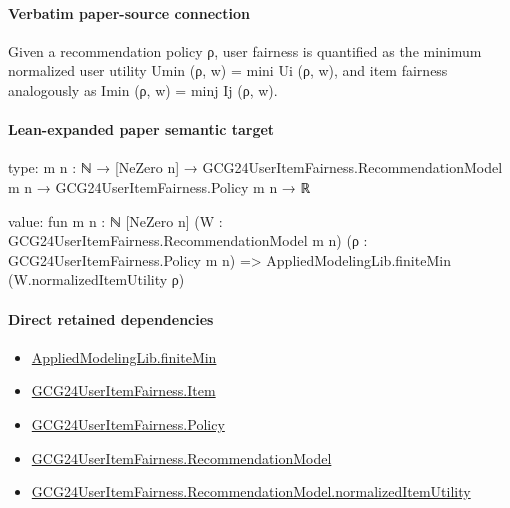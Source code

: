 \documentclass[10pt]{article}
\begin{document}
\paragraph{Verbatim paper-source connection}
\begin{ReviewVerbatim}
Given a recommendation policy ρ, user fairness is quantified as the minimum normalized user utility
Umin (ρ, w) = mini Ui (ρ, w), and item fairness analogously as Imin (ρ, w) = minj Ij (ρ, w).
\end{ReviewVerbatim}



\paragraph{Lean-expanded paper semantic target}
\begin{ReviewVerbatim}
type:
{m n : ℕ} → [NeZero n] → GCG24UserItemFairness.RecommendationModel m n → GCG24UserItemFairness.Policy m n → ℝ

value:
fun {m n : ℕ} [NeZero n] (W : GCG24UserItemFairness.RecommendationModel m n) (ρ : GCG24UserItemFairness.Policy m n) =>
  AppliedModelingLib.finiteMin (W.normalizedItemUtility ρ)
\end{ReviewVerbatim}

\paragraph{Direct retained dependencies}
\begin{itemize}\raggedright
\item \hyperlink{governing-declaration-2625aae50bf9c0bc}{Applied\allowbreak{}Modeling\allowbreak{}Lib.\allowbreak{}finite\allowbreak{}Min}
\item \hyperlink{governing-declaration-a7c560a429c6e204}{GCG24\allowbreak{}User\allowbreak{}Item\allowbreak{}Fairness.\allowbreak{}Item}
\item \hyperlink{governing-declaration-34ca6b905b48428a}{GCG24\allowbreak{}User\allowbreak{}Item\allowbreak{}Fairness.\allowbreak{}Policy}
\item \hyperlink{governing-declaration-4b845f20f80fb146}{GCG24\allowbreak{}User\allowbreak{}Item\allowbreak{}Fairness.\allowbreak{}Recommendation\allowbreak{}Model}
\item \hyperlink{paper-prerequisite-bce270fcac2ae7f9}{GCG24\allowbreak{}User\allowbreak{}Item\allowbreak{}Fairness.\allowbreak{}Recommendation\allowbreak{}Model.\allowbreak{}normalized\allowbreak{}Item\allowbreak{}Utility}
\end{itemize}
\end{document}
